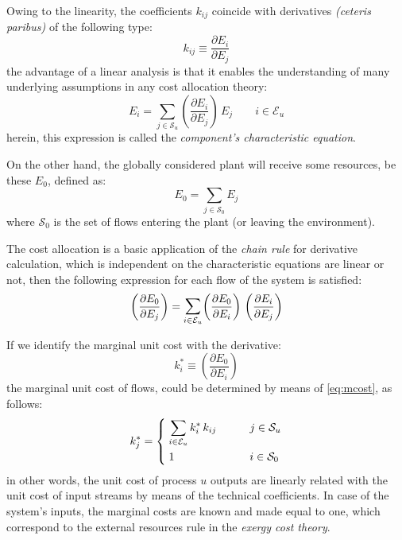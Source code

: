 \documentclass[energies,article,submit,moreauthors,pdftex]{Definitions/mdpi}
\newcommand{\dpartial}[2]{\left(\dfrac{\partial E_{#1}}{\partial E_{#2}}\right)}
\newcommand{\bsum}{\mathlarger{\sum}}
\begin{document}
Owing to the linearity, the coefficients $k_{ij}$ coincide with derivatives \emph{(ceteris paribus)} of the following type:
\begin{equation}
    k_{ij}\equiv\dfrac{\partial E_{i}}{\partial E_{j}}
\end{equation}
the advantage of a linear analysis is that it enables the understanding of many underlying assumptions in any cost allocation theory:
\begin{equation}
    E_i=\sum_{j\in\mathcal{S}_u}{\dpartial{i}{j}\,E_j} \qquad i\in\mathcal{E}_u
    \label{eq:deqchar}
\end{equation}
herein, this expression is called the \emph{component's characteristic equation}.

On the other hand, the globally considered plant will receive some resources, be these $E_0$, defined as:
\begin{equation}
E_0=\sum_{j\in\mathcal{S}_0}{E_j}
\end{equation}
where $\mathcal{S}_0$ is the set of flows entering the plant (or leaving the environment).

The cost allocation is a basic application of the \emph{chain rule} for derivative calculation, which is independent on the characteristic equations are linear or not, then the following expression for each flow of the system is satisfied:
\begin{equation}
\dpartial{0}{j}=\bsum_{i\in\mathcal{E}_u}{\dpartial{0}{i}\,\dpartial{i}{j}}
\label{eq:mcost}
\end{equation}

If we identify the marginal unit cost with the derivative:
\begin{equation}
k_i^*\equiv\dpartial{0}{i}
\end{equation}
the marginal unit cost of flows, could be determined by means of  \cref{eq:mcost}, as follows:
\begin{equation}
    k_j^*=\begin{dcases}
    \;\sum\limits_{i\in\mathcal{E}_u}{k_i^*\,k_{ij}} \qquad &j\in\mathcal{S}_u \\
    \;1 \qquad &i\in\mathcal{S}_0
    \end{dcases}
    \label{eq:kchar}
\end{equation}
in other words, the unit cost of process $u$ outputs are linearly related with the unit cost of input streams by means of the technical coefficients. In case of the system's inputs, the marginal costs are known and made equal to one, which correspond to the external resources rule in the \emph{exergy cost theory}.
\end{document}
